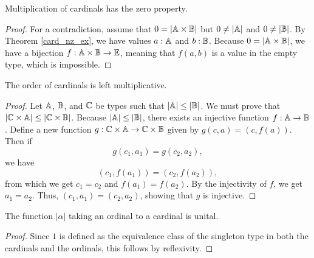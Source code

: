 \documentclass[../../math.tex]{subfiles}
\begin{document}
\begin{instance}
    Multiplication of cardinals has the zero property.
\end{instance}
\begin{proof}
    For a contradiction, assume that $0 = |\mathbb{A} \times \mathbb{B}|$ but $0 \neq |\mathbb{A}|$ and
    $0 \neq |\mathbb{B}|$.  By Theorem \ref{card_nz_ex}, we have values $a : \mathbb{A}$ and $b
    : \mathbb{B}$.  Because $0 = |\mathbb{A} \times \mathbb{B}|$, we have a bijection $f : \mathbb{A} \times \mathbb{B}
    \to \mathbb{E}$, meaning that $f(a, b)$ is a value in the empty type, which is
    impossible.
\end{proof}

\begin{instance}
    The order of cardinals is left multiplicative.
\end{instance}
\begin{proof}
    Let $\mathbb{A}$, $\mathbb{B}$, and $\mathbb{C}$ be types such that $|\mathbb{A}| \leq |\mathbb{B}|$.  We must prove
    that $|\mathbb{C} \times \mathbb{A}| \leq |\mathbb{C} \times \mathbb{B}|$.  Because $|\mathbb{A}| \leq |\mathbb{B}|$, there
    exists an injective function $f : \mathbb{A} \to \mathbb{B}$.  Define a new function $g : \mathbb{C}
    \times \mathbb{A} \to \mathbb{C} \times \mathbb{B}$ given by $g(c, a) = (c, f(a))$.  Then if
    \[
        g(c_1, a_1) = g(c_2, a_2),
    \]
    we have
    \[
        (c_1, f(a_1)) = (c_2, f(a_2)),
    \]
    from which we get $c_1 = c_2$ and $f(a_1) = f(a_2)$.  By the injectivity of
    $f$, we get $a_1 = a_2$.  Thus, $(c_1, a_1) = (c_2, a_2)$, showing that $g$
    is injective.
\end{proof}

\begin{instance}
    The function $|\alpha|$ taking an ordinal to a cardinal is unital.
\end{instance}
\begin{proof}
    Since $1$ is defined as the equivalence class of the singleton type in both
    the cardinals and the ordinals, this follows by reflexivity.
\end{proof}
\end{document}
